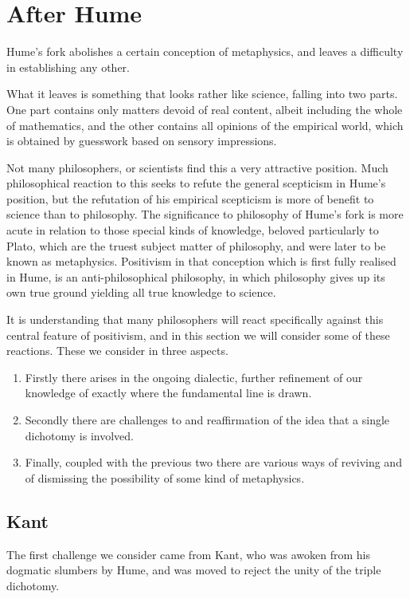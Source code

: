 \section{After Hume}\label{After}

Hume's fork abolishes a certain conception of metaphysics, and leaves a difficulty in establishing any other.

What it leaves is something that looks rather like science, falling into two parts.
One part contains only matters devoid of real content, albeit including the whole of mathematics, and the other contains all opinions of the empirical world, which is obtained by guesswork based on sensory impressions.

Not many philosophers, or scientists find this a very attractive position.
Much philosophical reaction to this seeks to refute the general scepticism in Hume's position, but the refutation of his empirical scepticism is more of benefit to science than to philosophy.
The significance to philosophy of Hume's fork is more acute in relation to those special kinds of knowledge, beloved particularly to Plato, which are the truest subject matter of philosophy, and were later to be known as metaphysics.
Positivism in that conception which is first fully realised in Hume, is an anti-philosophical philosophy, in which philosophy gives up its own true ground yielding all true knowledge to science.

It is understanding that many philosophers will react specifically against this central feature of positivism,
and in this section we will consider some of these reactions.
These we consider in three aspects.
\begin{enumerate}
\item
Firstly there arises in the ongoing dialectic, further refinement of our knowledge of exactly where the fundamental line is drawn.
\item
Secondly there are challenges to and reaffirmation of the idea that a single dichotomy is involved.
\item
Finally, coupled with the previous two there are various ways of reviving and of dismissing the possibility of some kind of metaphysics.
\end{enumerate}

\subsection{Kant}

The first challenge we consider came from Kant, who was awoken from his dogmatic slumbers by Hume, and was moved to reject the unity of the triple dichotomy.
